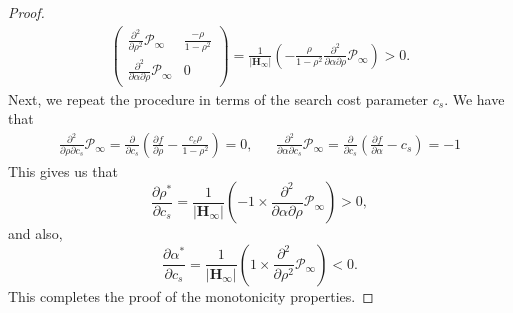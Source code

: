 \documentclass[10pt,a4paper]{amsart}
\begin{document}
\begin{proof}
\begin{align*}
\begin{pmatrix}
        \frac{\partial^2}{\partial \rho^2 } \mathcal{P}_\infty & \frac{-\rho}{1-\rho^2} \\
        \frac{\partial^2}{\partial \alpha \partial \rho } \mathcal{P}_\infty & 0
    \end{pmatrix} = \frac{1}{|\mathbf{H}_\infty|} \left( -\frac{\rho}{1-\rho^2} \frac{\partial^2}{\partial \alpha \partial \rho } \mathcal{P}_\infty \right) > 0.
\end{align*}
Next, we repeat the procedure in terms of the search cost parameter $c_s$. We have that
\begin{align*}
    \frac{\partial^2}{\partial \rho \partial c_s} \mathcal{P}_\infty = \frac{\partial}{\partial c_s} \left( \frac{\partial f}{\partial \rho} - \frac{c_c \rho}{1-\rho^2} \right) = 0, &&
    \frac{\partial^2}{\partial \alpha \partial c_s} \mathcal{P}_\infty = \frac{\partial}{\partial c_s} \left( \frac{\partial f}{\partial \alpha} - c_s \right) = -1
\end{align*}
This gives us that
\begin{equation*}
    \frac{\partial \rho^*}{\partial c_s} = \frac{1}{|\mathbf{H}_\infty|} \left( -1 \times \frac{\partial^2}{\partial \alpha \partial \rho } \mathcal{P}_\infty \right)> 0,
\end{equation*}
and also,
\begin{equation*}
    \frac{\partial \alpha^*}{\partial c_s} = \frac{1}{|\mathbf{H}_\infty|} \left( 1 \times \frac{\partial^2}{\partial \rho^2 } \mathcal{P}_\infty \right) < 0.
\end{equation*}
This completes the proof of the monotonicity properties.


\end{proof}
\end{document}

